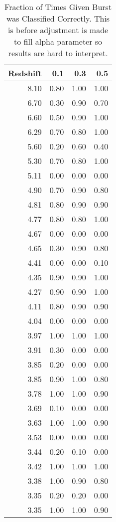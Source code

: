 \begin{table}[H]
\begin{center}
\begin{tabular}{rrrr}
  \hline
Redshift & 0.1 & 0.3 & 0.5 \\ 
  \hline
8.10 & 0.80 & 1.00 & 1.00 \\ 
  6.70 & 0.30 & 0.90 & 0.70 \\ 
  6.60 & 0.50 & 0.90 & 1.00 \\ 
  6.29 & 0.70 & 0.80 & 1.00 \\ 
  5.60 & 0.20 & 0.60 & 0.40 \\ 
  5.30 & 0.70 & 0.80 & 1.00 \\ 
  5.11 & 0.00 & 0.00 & 0.00 \\ 
  4.90 & 0.70 & 0.90 & 0.80 \\ 
  4.81 & 0.80 & 0.90 & 0.90 \\ 
  4.77 & 0.80 & 0.80 & 1.00 \\ 
  4.67 & 0.00 & 0.00 & 0.00 \\ 
  4.65 & 0.30 & 0.90 & 0.80 \\ 
  4.41 & 0.00 & 0.00 & 0.10 \\ 
  4.35 & 0.90 & 0.90 & 1.00 \\ 
  4.27 & 0.90 & 0.90 & 1.00 \\ 
  4.11 & 0.80 & 0.90 & 0.90 \\ 
  4.04 & 0.00 & 0.00 & 0.00 \\ 
  3.97 & 1.00 & 1.00 & 1.00 \\ 
  3.91 & 0.30 & 0.00 & 0.00 \\ 
  3.85 & 0.20 & 0.00 & 0.00 \\ 
  3.85 & 0.90 & 1.00 & 0.80 \\ 
  3.78 & 1.00 & 1.00 & 0.90 \\ 
  3.69 & 0.10 & 0.00 & 0.00 \\ 
  3.63 & 1.00 & 1.00 & 0.90 \\ 
  3.53 & 0.00 & 0.00 & 0.00 \\ 
  3.44 & 0.20 & 0.10 & 0.00 \\ 
  3.42 & 1.00 & 1.00 & 1.00 \\ 
  3.38 & 1.00 & 0.90 & 0.80 \\ 
  3.35 & 0.20 & 0.20 & 0.00 \\ 
  3.35 & 1.00 & 1.00 & 0.90 \\ 
   \hline
\end{tabular}
\caption{Fraction of Times Given Burst was Classified Correctly. This is before adjustment is made to fill alpha parameter so results are hard to interpret.}
\end{center}
\end{table}
